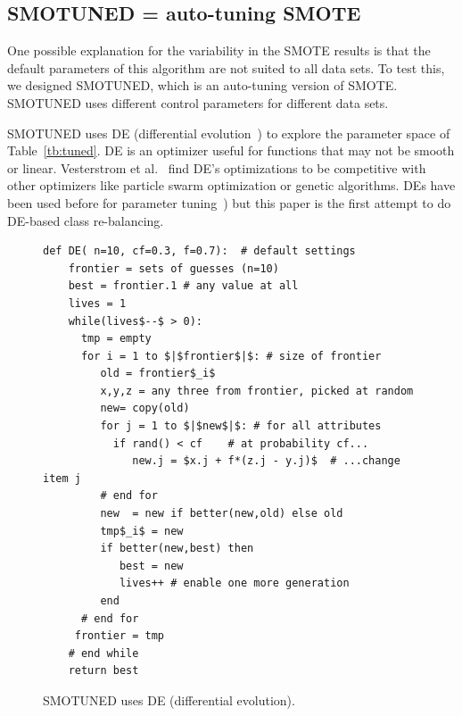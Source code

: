 \documentclass[sigconf]{acmart}
\theoremstyle{break}
\newcommand{\sma}{{\sc SMOTE}}
\newcommand{\smb}{{\sc SMOTUNED}}
\begin{document}
\subsection{SMOTUNED = auto-tuning {\sma}}
\label{sect:smotuned}

One possible explanation for the variability in the {\sma} results is that the
default parameters of this algorithm are not suited to all data sets. To test this,
we designed {\smb}, which is an auto-tuning version of {\sma}. {\smb}
uses different control parameters for different data sets.


 
{\smb} uses DE (differential evolution~\cite{storn1997differential}) to explore the parameter space of
Table~\ref{tb:tuned}.  DE is an
optimizer useful for functions that may not be smooth or linear.  Vesterstrom et al.~\cite{vesterstrom2004comparative} find   DE's optimizations to be  competitive with other optimizers like 
   particle swarm optimization or genetic algorithms.
   DEs have been used before for   parameter tuning~\cite{omran2005differential, chiha2012tuning,fu2016tuning,fu2017easy, agrawal2016wrong}) but this paper is  the first attempt to do
   DE-based class re-balancing.

\begin{figure}[!t]
\small 
\begin{lstlisting}[mathescape,linewidth=6.7cm,frame=none,numbers=right ]
  def DE( n=10, cf=0.3, f=0.7):  # default settings
    frontier = sets of guesses (n=10)
    best = frontier.1 # any value at all
    lives = 1
    while(lives$--$ > 0): 
      tmp = empty
      for i = 1 to $|$frontier$|$: # size of frontier
         old = frontier$_i$
         x,y,z = any three from frontier, picked at random
         new= copy(old)  
         for j = 1 to $|$new$|$: # for all attributes
           if rand() < cf    # at probability cf...
              new.j = $x.j + f*(z.j - y.j)$  # ...change item j
         # end for
         new  = new if better(new,old) else old
         tmp$_i$ = new 
         if better(new,best) then
            best = new
            lives++ # enable one more generation
         end                  
      # end for
     frontier = tmp
    # end while
    return best
\end{lstlisting} 
\caption{SMOTUNED uses DE (differential evolution).}
\label{fig:pseudo_DE} 
\vspace{-0.3cm}
\end{figure}
\end{document}
